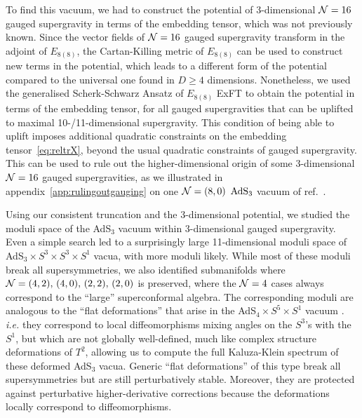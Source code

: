 \documentclass[a4paper, 11pt]{article}
\numberwithin{equation}{section}
\newcommand{\EE}{\ensuremath{E_{8(8)}}\xspace}
\newcommand{\+}{\oplus}
\begin{document}
To find this vacuum, we had to construct the potential of 3-dimensional ${\cal N}=16$ gauged supergravity in terms of the embedding tensor, which was not previously known. Since the vector fields of ${\cal N}=16$ gauged supergravity transform in the adjoint of $\EE$, the Cartan-Killing metric of $\EE$ can be used to construct new terms in the potential, which leads to a different form of the potential compared to the universal one found in $D \geq 4$ dimensions. Nonetheless, we used the generalised Scherk-Schwarz Ansatz of $\EE$ ExFT \cite{Galli:2022idq} to obtain the potential in terms of the embedding tensor, for all gauged supergravities that can be uplifted to maximal 10-/11-dimensional supergravity. This condition of being able to uplift imposes additional quadratic constraints on the embedding tensor~\eqref{eq:reltrX}, beyond the usual quadratic constraints of gauged supergravity. This can be used to rule out the higher-dimensional origin of some 3-dimensional ${\cal N}=16$ gauged supergravities, as we illustrated in appendix~\ref{app:rulingoutgauging} on one ${\cal N}=(8,0)$ ${\rm AdS}_{3}$ vacuum of ref.~\cite{Deger:2019tem}.

Using our consistent truncation and the 3-dimensional potential, we studied the moduli space of the AdS$_3$ vacuum within 3-dimensional gauged supergravity. Even a simple search led to a surprisingly large 11-dimensional moduli space of AdS$_3 \times S^3 \times S^3 \times S^1$ vacua, with more moduli likely. While most of these moduli break all supersymmetries, we also identified submanifolds where ${\cal N}=(4,2),\, (4,0),\, (2,2),\, (2,0)$ is preserved, where the ${\cal N}=4$ cases always correspond to the ``large'' superconformal algebra. The corresponding moduli are analogous to the  ``flat deformations'' that arise in the AdS$_4 \times S^5 \times S^1$ vacuum \cite{Guarino:2020gfe,Guarino:2021hrc,Giambrone:2021zvp,Giambrone:2021wsm}. \textit{i.e.} they correspond to local diffeomorphisms mixing angles on the $S^3$'s with the $S^1$, but which are not globally well-defined, much like complex structure deformations of $T^2$, allowing us to compute the full Kaluza-Klein spectrum of these deformed AdS$_3$ vacua. Generic ``flat deformations'' of this type break all supersymmetries but are still perturbatively stable. Moreover, they are protected against perturbative higher-derivative corrections because the deformations locally correspond to diffeomorphisms.
\end{document}
